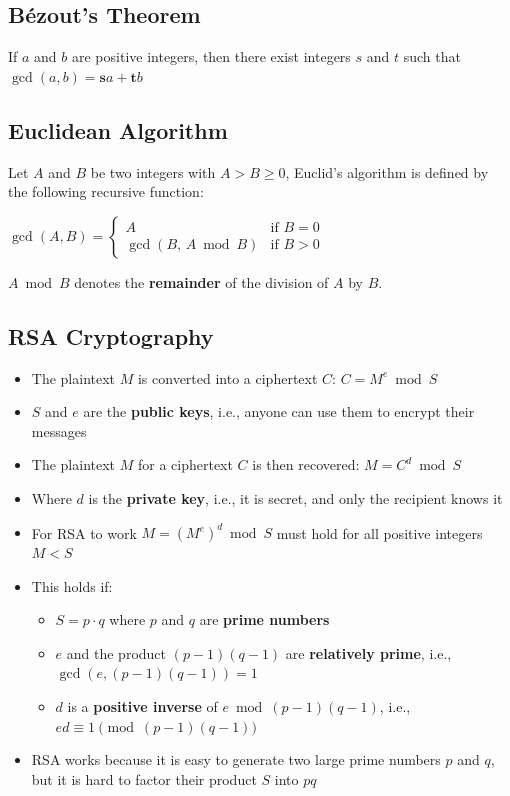 \subsection{Bézout's Theorem}
If $a$ and $b$ are positive integers, then there exist integers $s$ and $t$ such that $\gcd(a,b) = \bm{s}a + \bm{t}b$

\subsection{Euclidean Algorithm}
Let $A$ and $B$ be two integers with $A > B \geq 0$, Euclid's algorithm is defined by the following recursive function:

$\gcd(A, B) =
\begin{cases}
  A & \text{if } B = 0 \\
  \gcd(B,\, A \bmod B) & \text{if } B > 0
\end{cases}$

$A \bmod B$ denotes the \textbf{remainder} of the division of $A$ by $B$.


\subsection{RSA Cryptography}
\begin{itemize}
  \item The plaintext $M$ is converted into a ciphertext $C$: $C = M^{e} \bmod S$
  \item $S$ and $e$ are the \textbf{public keys}, i.e., anyone can use them to encrypt their messages
  \item The plaintext $M$ for a ciphertext $C$ is then recovered: $M = C^{d} \bmod S$
  \item Where $d$ is the \textbf{private key}, i.e., it is secret, and only the recipient knows it
  \item For RSA to work $M = (M^{e})^{d} \bmod S$ must hold for all positive integers $M < S$
  \item This holds if:
  \begin{itemize}
    \item $S = p \cdot q$ where $p$ and $q$ are \textbf{prime numbers}
    \item $e$ and the product $(p-1)(q-1)$ are \textbf{relatively prime}, i.e., $\gcd(e, (p-1)(q-1)) = 1$
    \item $d$ is a \textbf{positive inverse} of $e \bmod (p-1)(q-1)$, i.e., $ed \equiv 1 \pmod{(p-1)(q-1)}$
  \end{itemize}
  \item RSA works because it is easy to generate two large prime numbers $p$ and $q$, but it is hard to factor their product $S$ into $pq$
\end{itemize}

